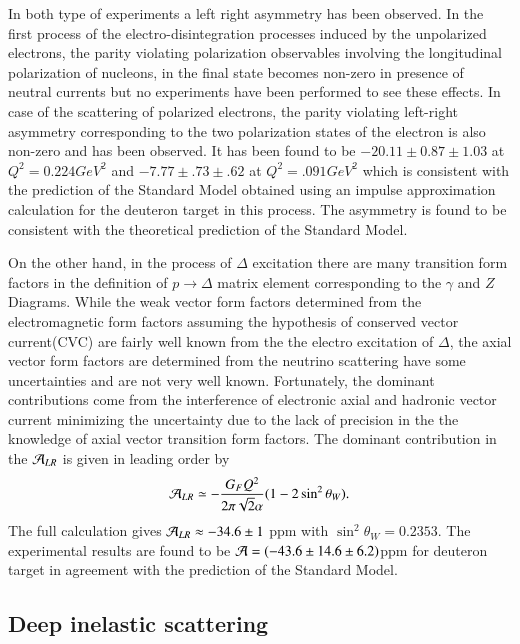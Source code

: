 In both type of experiments a left right asymmetry has been observed. In the first process of the electro-disintegration  processes induced by the unpolarized electrons,  the parity violating polarization observables involving the longitudinal polarization of nucleons, in the final state becomes non-zero in presence of neutral currents but no experiments have been  performed to see these effects. In case of the scattering of polarized electrons, the parity violating left-right asymmetry corresponding to the two polarization states of the electron is also non-zero and has been observed. It has been found to be
$-20.11\pm0.87\pm1.03$ at $Q^2=0.224GeV^2$ \cite{key23} and $-7.77\pm.73\pm.62$ at $Q^2=.091 GeV^2$ \cite{key24} which is consistent with the prediction of the Standard Model obtained using an impulse approximation calculation for the deuteron target in this process. The asymmetry is found to be consistent with the theoretical prediction of the Standard Model. 

 On the other hand,  in the process of $\Delta$  excitation there are many transition form factors in the definition of  $p\rightarrow \Delta $ matrix element corresponding to the  $\gamma$ and $Z$ Diagrams. While the weak vector form factors determined from the electromagnetic form factors assuming the hypothesis of conserved vector current(CVC) are fairly well known from the the electro excitation of $\Delta$,  the axial vector form factors are determined from the neutrino scattering have some uncertainties and are not very well known.  Fortunately,  the dominant contributions come from the interference of electronic axial and hadronic vector current  minimizing the uncertainty due to the lack of precision in the the knowledge of axial vector transition form factors.  The dominant contribution in the ${\cal A}_{LR}$   is given in leading order by  
\begin{equation}
 {\cal A}_{LR}\simeq -\frac{G_F Q^2}{2\pi\sqrt{2}\alpha}(1-2\sin^2\theta_W). \label{chap9-eq27}
\end{equation}
 The full calculation gives ${\cal A}_{LR}\approx-34.6\pm 1$ ppm with $\sin^2\theta_W=0.2353$. The experimental results are found to be ${\cal A}= (-43.6\pm14.6\pm6.2)$ppm for deuteron target \cite{key25} in agreement with the prediction of the Standard Model.

\subsection{Deep inelastic scattering}\label{chap9-subsec3.3}

